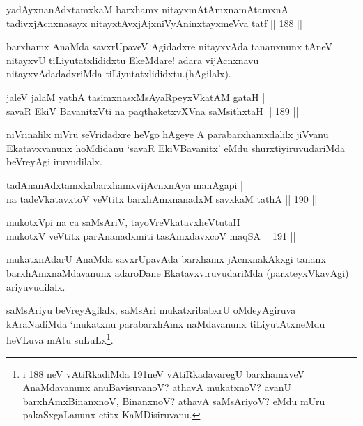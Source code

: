 \begin{shl}
yadAyxnanAdxtamxkaM barxhamx nitayxmAtAmxnamAtamxnA |\\
tadivxjAcnxnasayx nitayxtAvxjAjxniVyAninxtayxmeVva tatf \hfill || 188 ||
\end{shl}

\begin{artha}
barxhamx AnaMda savxrUpaveV Agidadxre nitayxvAda tananxnunx tAneV nitayxvU tiLiyutatxlididxtu EkeMdare! adara vijAcnxnavu nitayxvAdadadxriMda tiLiyutatxlididxtu.(hAgilalx).
\end{artha}


\begin{shl}
jaleV jalaM yathA tasimxnasxMsAyaRpeyxVkatAM gataH |\\
savaR EkiV BavanitxVti na paqthaketxvXVna saMsithxtaH \hfill || 189 ||
\end{shl}

\begin{artha}
niVrinalilx niVru seVridadxre heVgo hAgeye A parabarxhamxdalilx jiVvanu Ekatavxvanunx hoMdidanu `savaR EkiVBavanitx' eMdu shurxtiyiruvudariMda beVreyAgi iruvudilalx.
\end{artha}


\begin{shl}
tadAnanAdxtamxkabarxhamxvijAcnxnAya manAgapi |\\
na tadeVkatavxtoV veVtitx barxhAmx\s \s nanadxM savxkaM tathA \hfill || 190 ||
\end{shl}

\begin{shl}
mukotxV\s pi na ca saMsAriV, tayoVreVkatavxheVtutaH |\\
mukotxV veVtitx parAnanadxmiti tasAmxdavxcoV maqSA \hfill || 191 ||
\end{shl}

\begin{artha}
mukatxnAdarU AnaMda savxrUpavAda barxhamx jAcnxnakAkxgi tananx barxhAmxnaMdavanunx adaroDane EkatavxviruvudariMda (parxteyxVkavAgi) ariyuvudilalx.

saMsAriyu beVreyAgilalx, saMsAri mukatxribabxrU oMdeyAgiruva kAraNadiMda `mukatxnu parabarxhAmx naMdavanunx tiLiyutAtxneMdu heVLuva mAtu suLuLx\footnote[1]{i 188 neV vAtiRkadiMda 191neV vAtiRkadavaregU barxhamxveV AnaMdavanunx anuBavisuvanoV? athavA mukatxnoV? avanU barxhAmxBinanxnoV, BinanxnoV? athavA saMsAriyoV? eMdu mUru pakaSxgaLanunx etitx KaMDisiruvanu.}.
\end{artha}

